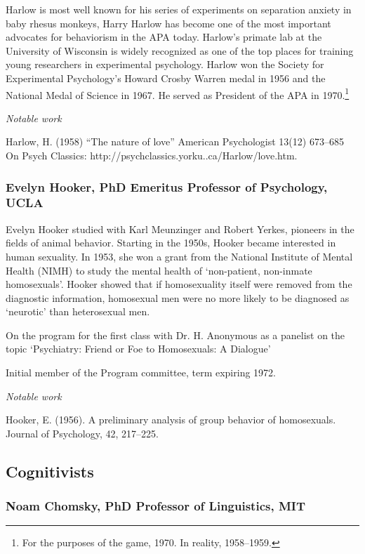 \begin{refsection}
Harlow is most well known for his series of experiments on separation anxiety in baby rhesus monkeys, Harry Harlow has become one of the most important advocates for behaviorism in the APA today. Harlow's primate lab at the University of Wisconsin is widely recognized as one of the top places for training young researchers in experimental psychology. Harlow won the Society for Experimental Psychology's Howard Crosby Warren medal in 1956 and the National Medal of Science in 1967. He served as President of the APA in 1970.\footnote{For the purposes of the game, 1970. In reality, 1958--1959.} 

\emph{Notable work}

Harlow, H. (1958) “The nature of love” American Psychologist 13(12) 673--685 On Psych Classics: http:\slash \slash psychclassics.yorku..ca\slash Harlow\slash love.htm.

\subsubsection{Evelyn Hooker, PhD Emeritus Professor of Psychology, UCLA}
\label{evelynhookerphdemeritusprofessorofpsychologyucla}

Evelyn Hooker studied with Karl Meunzinger and Robert Yerkes, pioneers in the fields of animal behavior. Starting in the 1950s, Hooker became interested in human sexuality. In 1953, she won a grant from the National Institute of Mental Health (NIMH) to study the mental health of `non-patient, non-inmate homosexuals'. Hooker showed that if homosexuality itself were removed from the diagnostic information, homosexual men were no more likely to be diagnosed as `neurotic' than heterosexual men.

On the program for the first class with Dr. H. Anonymous as a panelist on the topic `Psychiatry: Friend or Foe to Homosexuals: A Dialogue'

Initial member of the Program committee, term expiring 1972.

\emph{Notable work}

Hooker, E. (1956). A preliminary analysis of group behavior of homosexuals. Journal of Psychology, 42, 217--225.

\subsection{Cognitivists}
\label{cognitivists}

\subsubsection{Noam Chomsky, PhD Professor of Linguistics, MIT}
\label{noamchomskyphdprofessoroflinguisticsmit}


\end{refsection}
